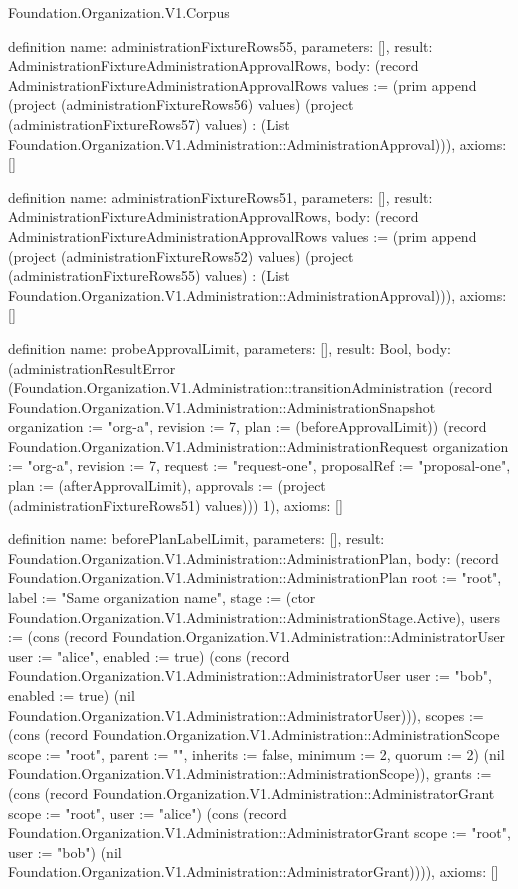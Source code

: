 \begin{lexlean}{Foundation.Organization.V1.Corpus}
\begin{semanticmodule}
definition{
  name: administrationFixtureRows55,
  parameters: [],
  result: AdministrationFixtureAdministrationApprovalRows,
  body: (record AdministrationFixtureAdministrationApprovalRows {values := (prim append (project (administrationFixtureRows56) values) (project (administrationFixtureRows57) values) : (List Foundation.Organization.V1.Administration::AdministrationApproval))}),
  axioms: []
}

definition{
  name: administrationFixtureRows51,
  parameters: [],
  result: AdministrationFixtureAdministrationApprovalRows,
  body: (record AdministrationFixtureAdministrationApprovalRows {values := (prim append (project (administrationFixtureRows52) values) (project (administrationFixtureRows55) values) : (List Foundation.Organization.V1.Administration::AdministrationApproval))}),
  axioms: []
}

definition{
  name: probeApprovalLimit,
  parameters: [],
  result: Bool,
  body: (administrationResultError (Foundation.Organization.V1.Administration::transitionAdministration (record Foundation.Organization.V1.Administration::AdministrationSnapshot {organization := "org-a", revision := 7, plan := (beforeApprovalLimit)}) (record Foundation.Organization.V1.Administration::AdministrationRequest {organization := "org-a", revision := 7, request := "request-one", proposalRef := "proposal-one", plan := (afterApprovalLimit), approvals := (project (administrationFixtureRows51) values)})) 1),
  axioms: []
}

definition{
  name: beforePlanLabelLimit,
  parameters: [],
  result: Foundation.Organization.V1.Administration::AdministrationPlan,
  body: (record Foundation.Organization.V1.Administration::AdministrationPlan {root := "root", label := "Same organization name", stage := (ctor Foundation.Organization.V1.Administration::AdministrationStage.Active), users := (cons (record Foundation.Organization.V1.Administration::AdministratorUser {user := "alice", enabled := true}) (cons (record Foundation.Organization.V1.Administration::AdministratorUser {user := "bob", enabled := true}) (nil Foundation.Organization.V1.Administration::AdministratorUser))), scopes := (cons (record Foundation.Organization.V1.Administration::AdministrationScope {scope := "root", parent := "", inherits := false, minimum := 2, quorum := 2}) (nil Foundation.Organization.V1.Administration::AdministrationScope)), grants := (cons (record Foundation.Organization.V1.Administration::AdministratorGrant {scope := "root", user := "alice"}) (cons (record Foundation.Organization.V1.Administration::AdministratorGrant {scope := "root", user := "bob"}) (nil Foundation.Organization.V1.Administration::AdministratorGrant)))}),
  axioms: []
}


\end{semanticmodule}
\end{lexlean}
